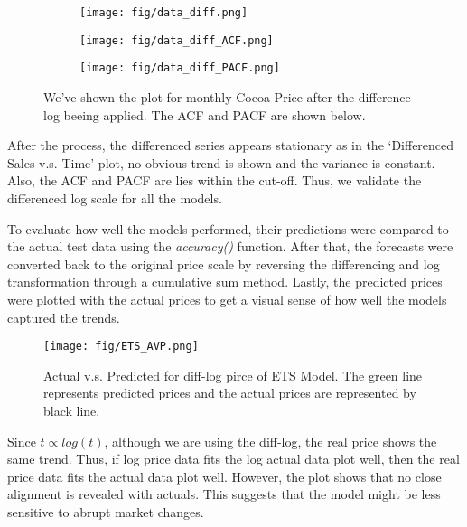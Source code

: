\documentclass[10pt]{article}
\begin{document}
\begin{figure}[h!]
    \captionsetup{font=scriptsize}
    \centering
    \begin{subfigure}[b]{0.7\textwidth}
        \centering
        \texttt{[image: fig/data\_diff.png]}
        \label{fig:m5_c1}
    \end{subfigure}
    \vspace{1em}
    \begin{subfigure}[b]{0.45\textwidth}
        \centering
        \texttt{[image: fig/data\_diff\_ACF.png]}
        \label{fig:m5_c2}
    \end{subfigure}
    \begin{subfigure}[b]{0.45\textwidth}
        \centering
        \texttt{[image: fig/data\_diff\_PACF.png]}
        \label{fig:m5_qq}
    \end{subfigure}
    \caption{We've shown the plot for monthly Cocoa Price after the difference log beeing applied. The ACF and PACF are shown below.}
    \label{fig:diff_lof}
\end{figure}
\noindent
After the process, the differenced
series appears stationary as in the ‘Differenced Sales v.s. Time’ plot, no obvious trend is shown and the variance is constant. Also, the ACF and PACF are lies within the cut-off. Thus, we validate the differenced log scale for all the models.

\noindent
To evaluate how well the models performed, their predictions were compared to the actual test data using the \emph{accuracy()} function. After that, the forecasts were converted back to the original price scale by reversing the differencing and log transformation through a cumulative sum method. Lastly, the predicted prices were plotted with the actual prices to get a visual sense of how well the models captured the trends.
\begin{figure}[ht]
    \centering
    \captionsetup{font=scriptsize}
    \texttt{[image: fig/ETS\_AVP.png]}
    \caption{\scriptsize Actual v.s. Predicted for diff-log pirce of ETS Model. The green line represents predicted prices and the actual prices are represented by black line.}
    \label{fig:enter-label}
\end{figure}

\noindent
Since $t \propto log (t)$, although we are using the diff-log, the real price shows the same trend. Thus, if log price data fits the log actual data plot well, then the real price data fits the actual data plot well. However, the plot shows that no close alignment is revealed with actuals. This suggests that the model might be less sensitive to abrupt market changes.
\end{document}

